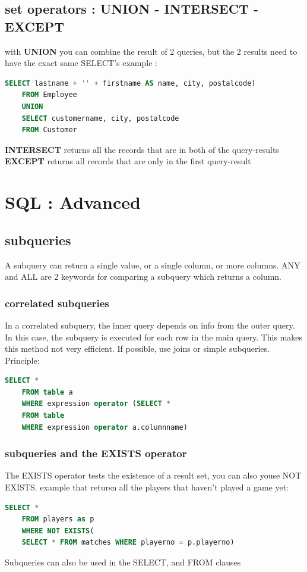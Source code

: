 \documentclass{report}
\begin{document}
	\section{set operators : UNION - INTERSECT - EXCEPT}
	with \textbf{UNION} you can combine the result of 2 queries, but the 2 results need to have the exact same SELECT's
	example : 
	\begin{lstlisting}[language=SQL]
	SELECT lastname + '' + firstname AS name, city, postalcode)
	FROM Employee
	UNION
	SELECT customername, city, postalcode
	FROM Customer\end{lstlisting}
	\textbf{INTERSECT} returns all the records that are in both of the query-results
	\textbf{EXCEPT} returns all records that are only in the first query-result
	
	\chapter{SQL : Advanced}
	\section{subqueries}
	A subquery can return a single value, or a single column, or more columns.
	ANY and ALL are 2 keywords for comparing a subquery which returns a column.
	\subsection{correlated subqueries}
	In a correlated subquery, the inner query depends on info from the outer query. In this case, the subquery is executed for each row in the main query. This makes this method not very efficient. If possible, use joins or simple subqueries. 
	Principle: 
	\begin{lstlisting}[language=SQL]
	SELECT * 
	FROM table a
	WHERE expression operator (SELECT *
	FROM table 
	WHERE expression operator a.columnname)\end{lstlisting}
	\subsection{subqueries and the EXISTS operator}
	The EXISTS operator tests the existence of a result set, you can also youse NOT EXISTS. example that retursn all the players that haven't played a game yet: 
	\begin{lstlisting}[language=SQL]
	SELECT * 
	FROM players as p
	WHERE NOT EXISTS(
	SELECT * FROM matches WHERE playerno = p.playerno)\end{lstlisting}
	Subqueries can also be used in the SELECT, and FROM clauses
	
\end{document}
